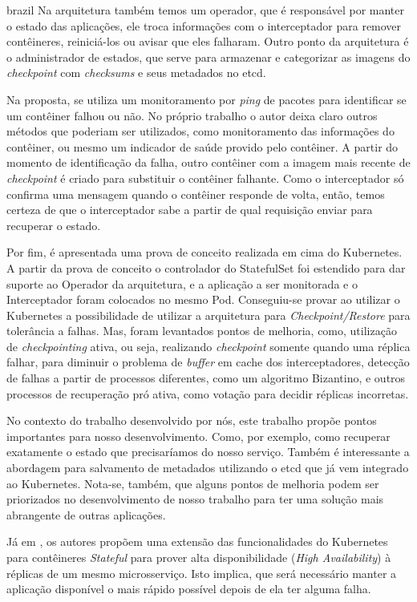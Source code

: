 \begin{otherlanguage*}{brazil}
Na arquitetura também temos um operador, que é responsável por manter o
estado das aplicações, ele troca informações com o interceptador para remover
contêineres, reiniciá-los ou avisar que eles falharam. Outro ponto da
arquitetura é o administrador de estados, que serve para armazenar e categorizar
as imagens do \textit{checkpoint} com \textit{checksums} e seus metadados no etcd.

Na proposta, se utiliza um monitoramento por \textit{ping} de pacotes para
identificar se um contêiner falhou ou não. No próprio trabalho o autor deixa
claro outros métodos que poderiam ser utilizados, como monitoramento das
informações do contêiner, ou mesmo um indicador de saúde provido pelo contêiner.
A partir do momento de identificação da falha, outro contêiner com a imagem
mais recente de \textit{checkpoint} é criado para substituir o contêiner
falhante. Como o interceptador só confirma uma mensagem quando o contêiner
responde de volta, então, temos certeza de que o interceptador sabe a partir
de qual requisição enviar para recuperar o estado.

Por fim, é apresentada uma prova de conceito realizada em cima do Kubernetes.
A partir da prova de conceito o controlador do StatefulSet foi estendido para
dar suporte ao Operador da arquitetura, e a aplicação a ser monitorada e o
Interceptador foram colocados no mesmo Pod. Conseguiu-se provar ao utilizar o
Kubernetes a possibilidade de utilizar a arquitetura para
\textit{Checkpoint/Restore} para tolerância a falhas. Mas, foram levantados
pontos de melhoria, como, utilização de \textit{checkpointing} ativa, ou seja,
realizando \textit{checkpoint} somente quando uma réplica falhar, para diminuir
o problema de \textit{buffer} em cache dos interceptadores, detecção de falhas
a partir de processos diferentes, como um algoritmo Bizantino, e outros
processos de recuperação pró ativa, como votação para decidir réplicas incorretas.

No contexto do trabalho desenvolvido por nós, este trabalho propõe pontos
importantes para nosso desenvolvimento. Como, por exemplo, como recuperar
exatamente o estado que precisaríamos do nosso serviço. Também é interessante
a abordagem para salvamento de metadados utilizando o etcd que já vem integrado
ao Kubernetes. Nota-se, também, que alguns pontos de melhoria podem ser
priorizados no desenvolvimento de nosso trabalho para ter uma solução mais
abrangente de outras aplicações.

Já em \cite{vayghan2021kubernetes}, os autores propõem uma extensão das
funcionalidades do Kubernetes para contêineres \textit{Stateful} para
prover alta disponibilidade (\textit{High Availability}) à réplicas de um mesmo
microsserviço. Isto implica, que será necessário manter a aplicação disponível
o mais rápido possível depois de ela ter alguma falha.


\end{otherlanguage*}
